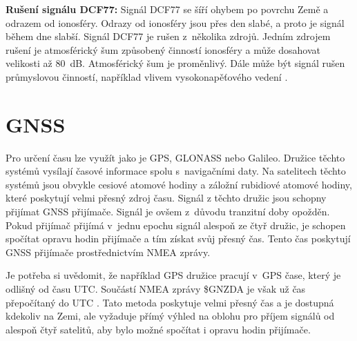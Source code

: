 \textbf{Rušení signálu DCF77:}
Signál DCF77 se šíří ohybem po povrchu Země a odrazem od ionosféry. Odrazy od ionosféry jsou přes den slabé, a proto je signál během dne slabší. Signál DCF77 je rušen z~několika zdrojů. Jedním zdrojem rušení je atmosférický šum způsobený činností ionosféry a může dosahovat velikosti až 80~dB. Atmosférický šum je proměnlivý. Dále může být signál rušen průmyslovou činností, například vlivem vysokonapěťového vedení \cite{vyvoj_hw_andel} \cite{hopf_dcf77}.

\section{GNSS}
Pro určení času lze využít  jako je GPS, GLONASS nebo Galileo. Družice těchto systémů vysílají časové informace spolu s~navigačními daty. Na satelitech těchto systémů jsou obvykle cesiové atomové hodiny a záložní rubidiové atomové hodiny, které poskytují velmi přesný zdroj času. Signál z těchto družic jsou schopny přijímat GNSS přijímače. Signál je ovšem z~důvodu tranzitní doby opožděn. Pokud přijímač přijímá v~jednu epochu signál alespoň ze čtyř družic, je schopen spočítat opravu hodin přijímače a tím získat svůj přesný čas. Tento čas poskytují GNSS přijímače prostřednictvím NMEA zprávy.

Je potřeba si uvědomit, že například GPS družice pracují v~GPS čase, který je odlišný od času UTC. Součástí NMEA zprávy \$GNZDA je však už čas přepočítaný do UTC \cite{ublox}. Tato metoda poskytuje velmi přesný čas a je dostupná kdekoliv na Zemi, ale vyžaduje přímý výhled na oblohu pro příjem signálů od alespoň čtyř satelitů, aby bylo možné spočítat i opravu hodin přijímače.

